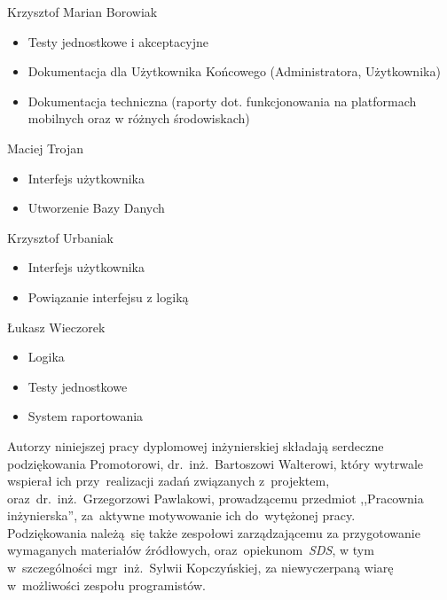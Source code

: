 \begin{description}
\item Krzysztof Marian Borowiak

\begin{itemize}
\item Testy jednostkowe i akceptacyjne
\item Dokumentacja dla Użytkownika Końcowego (Administratora, Użytkownika)
\item Dokumentacja techniczna (raporty dot. funkcjonowania na platformach mobilnych oraz w różnych środowiskach)
\end{itemize}
\noindent

\item Maciej Trojan

\begin{itemize}
\item Interfejs użytkownika
\item Utworzenie Bazy Danych
\end{itemize}
\noindent

\item Krzysztof Urbaniak

\begin{itemize}
\item Interfejs użytkownika
\item Powiązanie interfejsu z logiką
\end{itemize}
\noindent

\item Łukasz Wieczorek

\begin{itemize}
\item Logika
\item Testy jednostkowe
\item System raportowania
\end{itemize}
\noindent

\end{description}

Autorzy niniejszej pracy dyplomowej inżynierskiej składają serdeczne podziękowania Promotorowi, dr.~inż.~Bartoszowi Walterowi, który wytrwale wspierał ich przy~realizacji zadań związanych z~projektem, oraz~dr.~inż.~Grzegorzowi Pawlakowi, prowadzącemu przedmiot ,,Pracownia inżynierska'', za~aktywne motywowanie ich do~wytężonej pracy. \\

Podziękowania należą~się także zespołowi zarządzającemu za przygotowanie wymaganych materiałów źródłowych, oraz~opiekunom~\textit{SDS}, w tym w~szczególności mgr~inż.~Sylwii Kopczyńskiej, za niewyczerpaną wiarę w~możliwości zespołu programistów.

